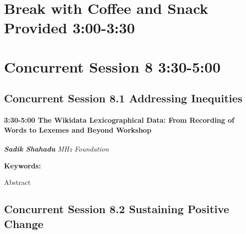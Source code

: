 \documentclass[
]{book}
\begin{document}
\hypertarget{break-with-coffee-and-snack-provided-300-330}{%
\section*{Break with Coffee and Snack Provided \textbar{} 3:00-3:30}\label{break-with-coffee-and-snack-provided-300-330}}

\hypertarget{concurrent-session-8-330-500}{%
\section*{Concurrent Session 8 \textbar{} 3:30-5:00}\label{concurrent-session-8-330-500}}

\hypertarget{concurrent-session-8.1-addressing-inequities}{%
\subsection*{Concurrent Session 8.1 \textbar{} Addressing Inequities}\label{concurrent-session-8.1-addressing-inequities}}

\begin{workshop}
\hypertarget{the-wikidata-lexicographical-data-from-recording-of-words-to-lexemes-and-beyond-workshop}{%
\paragraph*{\texorpdfstring{3:30-5:00 \textbar{} \textbf{The Wikidata
Lexicographical Data: From Recording of Words to Lexemes and Beyond}
\textbar{}
Workshop}{3:30-5:00 \textbar{} The Wikidata Lexicographical Data: From Recording of Words to Lexemes and Beyond \textbar{} Workshop}}\label{the-wikidata-lexicographical-data-from-recording-of-words-to-lexemes-and-beyond-workshop}}

\textbf{\emph{Sadik Shahadu}} \textbar{} \emph{MHz Foundation}

\textbf{Keywords:}

Abstract
\end{workshop}

\hypertarget{concurrent-session-8.2-sustaining-positive-change}{%
\subsection*{Concurrent Session 8.2 \textbar{} Sustaining Positive Change}\label{concurrent-session-8.2-sustaining-positive-change}}
\end{document}
